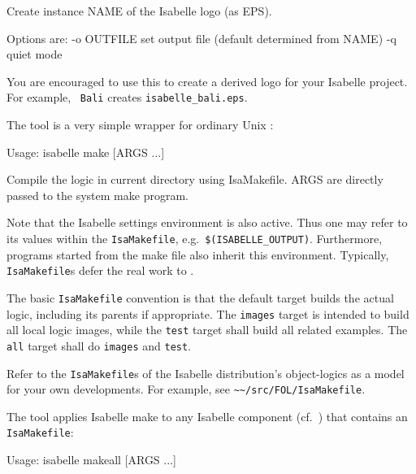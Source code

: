 \begin{isabellebody}
\begin{isamarkuptext}
\begin{ttbox}
  Create instance NAME of the Isabelle logo (as EPS).

  Options are:
    -o OUTFILE   set output file (default determined from NAME)
    -q           quiet mode
\end{ttbox}
  You are encouraged to use this to create a derived logo for your
  Isabelle project.  For example, \hyperlink{tool.logo}{\mbox{}}~\verb|Bali|
  creates \verb|isabelle_bali.eps|.%
\end{isamarkuptext}%
\isamarkuptrue%
%
\isamarkuptrue%
%
\begin{isamarkuptext}%
The \hypertarget{tool.make}{\hyperlink{tool.make}{\mbox{}}} tool is a very simple wrapper for
  ordinary Unix \hyperlink{executable.make}{\mbox{}}:
\begin{ttbox}
Usage: isabelle make [ARGS ...]

  Compile the logic in current directory using IsaMakefile.
  ARGS are directly passed to the system make program.
\end{ttbox}

  Note that the Isabelle settings environment is also active. Thus one
  may refer to its values within the \verb|IsaMakefile|, e.g.\
  \verb|$(ISABELLE_OUTPUT)|. Furthermore, programs started from
  the make file also inherit this environment.  Typically, \verb|IsaMakefile|s defer the real work to \hyperlink{tool.usedir}{\mbox{}}.

  \medskip The basic \verb|IsaMakefile| convention is that the
  default target builds the actual logic, including its parents if
  appropriate.  The \verb|images| target is intended to build all
  local logic images, while the \verb|test| target shall build
  all related examples.  The \verb|all| target shall do
  \verb|images| and \verb|test|.%
\end{isamarkuptext}%
\isamarkuptrue%
%
\isamarkuptrue%
%
\begin{isamarkuptext}%
Refer to the \verb|IsaMakefile|s of the Isabelle distribution's
  object-logics as a model for your own developments.  For example,
  see \verb|~~/src/FOL/IsaMakefile|.%
\end{isamarkuptext}%
\isamarkuptrue%
%
\isamarkuptrue%
%
\begin{isamarkuptext}%
The \hypertarget{tool.makeall}{\hyperlink{tool.makeall}{\mbox{}}} tool applies Isabelle make to any
  Isabelle component (cf.\ \secref{sec:components}) that contains an
  \verb|IsaMakefile|:
\begin{ttbox}
Usage: isabelle makeall [ARGS ...]


\end{ttbox}
\end{isamarkuptext}
\end{isabellebody}
